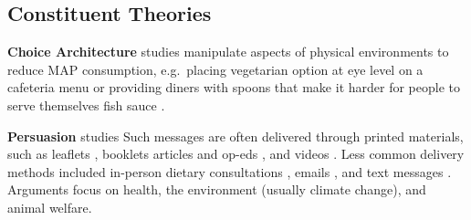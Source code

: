 \documentclass[sn-nature,referee,pdflatex]{sn-jnl}
\begin{document}
\subsection{Constituent Theories}\label{constituent-theories}

\textbf{Choice Architecture} studies
\citep{andersson2021, kanchanachitra2020} manipulate aspects of physical
environments to reduce MAP consumption, e.g.~placing vegetarian option
at eye level on a cafeteria menu \citep{andersson2021} or providing
diners with spoons that make it harder for people to serve themselves
fish sauce \citep{kanchanachitra2020}.

\begin{comment}
Maya suggests we put in a more representative DV
\end{comment}

\textbf{Persuasion} studies
\citep{kanchanachitra2020, abrahamse2007, acharya2004, banerjee2019, bianchi2022, bochmann2017, bschaden2020, carfora2023, hennessy2016, piester2020, cooney2014, cooney2016, feltz2022, haile2021, hatami2018, jalil2023, mathur2021effectiveness, merrill2009, norris2014, peacock2017, polanco2022, sparkman2021, weingarten2022}
Such messages are often delivered through printed materials, such as
leaflets \citep{haile2021, polanco2022}, booklets \citep{bianchi2022}
articles and op-eds \citep{sparkman2021, feltz2022}, and videos
\citep{sparkman2021, cooney2016, mathur2021effectiveness}. Less common
delivery methods included in-person dietary consultations
\citep{merrill2009}, emails \citep{banerjee2019}, and text messages
\citep{carfora2023}. Arguments focus on health, the environment (usually
climate change), and animal welfare.

\begin{comment}
Some are designed to be emotionally activating, e.g. presenting upsetting footage of factory farms [@polanco2022], while others present information more factually, for instance about the relationship between diet and cancer [@hatami2018].
Many persuasion studies combine arguments, such as a lecture on the health and environmental consequences of eating meat
These studies formed the majority of our database.
\end{comment}
\end{document}
